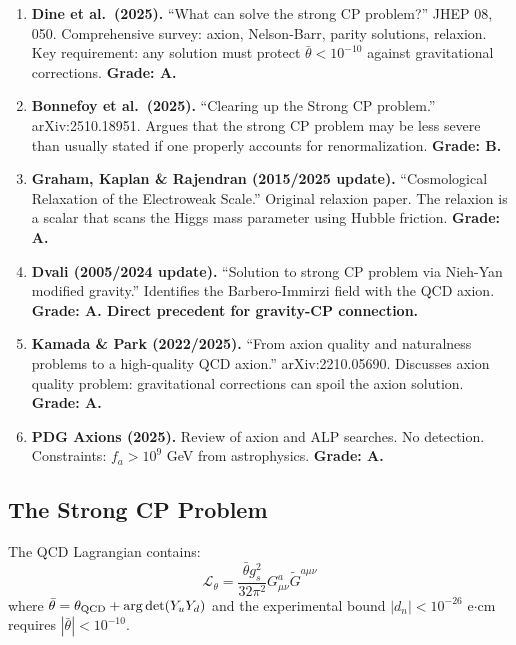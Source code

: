 \documentclass[11pt,a4paper]{article}
\begin{document}
\begin{enumerate}
\item \textbf{Dine et al.\ (2025).} ``What can solve the strong CP problem?'' JHEP 08, 050. Comprehensive survey: axion, Nelson-Barr, parity solutions, relaxion. Key requirement: any solution must protect $\bar\theta < 10^{-10}$ against gravitational corrections. \textbf{Grade: A.}

\item \textbf{Bonnefoy et al.\ (2025).} ``Clearing up the Strong CP problem.'' arXiv:2510.18951. Argues that the strong CP problem may be less severe than usually stated if one properly accounts for renormalization. \textbf{Grade: B.}

\item \textbf{Graham, Kaplan \& Rajendran (2015/2025 update).} ``Cosmological Relaxation of the Electroweak Scale.'' Original relaxion paper. The relaxion is a scalar that scans the Higgs mass parameter using Hubble friction. \textbf{Grade: A.}

\item \textbf{Dvali (2005/2024 update).} ``Solution to strong CP problem via Nieh-Yan modified gravity.'' Identifies the Barbero-Immirzi field with the QCD axion. \textbf{Grade: A. Direct precedent for gravity-CP connection.}

\item \textbf{Kamada \& Park (2022/2025).} ``From axion quality and naturalness problems to a high-quality QCD axion.'' arXiv:2210.05690. Discusses axion quality problem: gravitational corrections can spoil the axion solution. \textbf{Grade: A.}

\item \textbf{PDG Axions (2025).} Review of axion and ALP searches. No detection. Constraints: $f_a > 10^9$ GeV from astrophysics. \textbf{Grade: A.}
\end{enumerate}

\subsection{The Strong CP Problem}

The QCD Lagrangian contains:
\begin{equation}
\mathcal{L}_\theta = \frac{\bar\theta g_s^2}{32\pi^2}G_{\mu\nu}^a\tilde{G}^{a\mu\nu}
\end{equation}
where $\bar\theta = \theta_{\rm QCD} + \arg\det(Y_u Y_d)$ and the experimental bound $|d_n| < 10^{-26}$ e$\cdot$cm requires $|\bar\theta| < 10^{-10}$.
\end{document}
